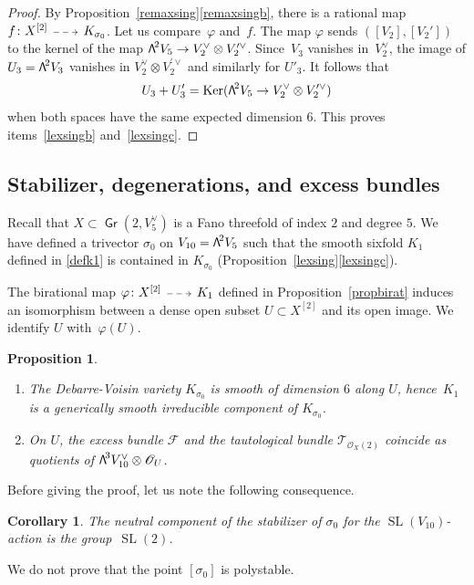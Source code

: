 \documentclass[11pt]{article}
\makeatletter
\newcommand{\skpt}{\smallskip}
\let\mathcal\mathscr
\newenvironment{enumeratea}
{\bgroup\def\theenumi{\alph{enumi}}\def\theenumii{\arabic{enumii}}\begin{enumerate}}
{\end{enumerate}\egroup}
\newcommand{\dradpl}{{\!\!\xymatrix@C=8mm{\ar@{-->}[r]&}\!\!}}
\newcommand{\dratst}{{\,\mathrel{\scalebox{.8}{$\dradpl$}}\,}}
\newcommand{\drascst}{{\,\mathrel{\scalebox{.6}{$\dradpl$}}\,}}
\newcommand{\dra}{\mathchoice{\dradpl}{\dratst}{\drascst}{\drascst}}
\newtheorem{coro}[lemm]{Corollary}
\newtheorem{prop}[lemm]{Proposition}
\theoremstyle{definition}
\newcommand\cF{\mathcal{F}}
\newcommand\cO{\mathcal{O}}\let\OO\cO
\newcommand\cT{\mathcal{T}}
\DeclareMathOperator{\Gr}{\mathsf{Gr}}
\let\phi\varphi
\let\dual\vee
\DeclareMathOperator{\Ker}{Ker}
\DeclareMathOperator{\SL}{SL}
\newcommand\bw[1]{{\hbox{\large$\mathsf{\Lambda}$}^{\!#1}}}
\renewcommand{\dratst}{\mathrel{\scalebox{.8}{$\dradpl$}}}
\renewcommand{\drascst}{\mathrel{\scalebox{.6}{$\dradpl$}}}
\makeatother
\begin{document}
\begin{proof}
By Proposition~\ref{remaxsing}\eqref{remaxsingb}, there is a rational map
$f\colon X^{[2]}\dra K_{\sigma_0}$. Let us compare~$\phi$ and~$f$. The map
$\phi$ sends $([V_2],[V_2'])$ to the kernel of the
map $\bw2V_5\to V_2^\dual\otimes V_2^{\prime\dual}$. Since~$V_3$ vanishes in~$V_2^\dual$,
the image of $U_3=\bw2V_3$ vanishes in $V_2^\dual\otimes V_2^{\prime\dual}$ and similarly for
$U'_3$. It follows that
\[
U_3+U'_3=\Ker (\bw2V_5\to V_2^\dual\otimes V_2^{\prime\dual})
\]
when both spaces have the same expected dimension $6$. This proves items~\eqref{lexsingb} and~\eqref{lexsingc}.
\end{proof}

\subsection{Stabilizer, degenerations, and excess bundles}
Recall that $X\subset \Gr(2,V_5^\dual)$ is a Fano threefold of index $2$ and degree $5$. We have defined a trivector $\sigma_0$ on $V_{10}=\bw2V_5$ such that the smooth sixfold $K_1$ defined in \eqref{defk1} is contained in $K_{\sigma_0}$ (Proposition~\ref{lexsing}\eqref{lexsingc}).

The birational map
$\phi\colon X^{[2]}\dra K_1$ defined in Proposition~\ref{propbirat}
induces an isomorphism between
a dense open subset $U\subset X^{[2]}$ and its open image. We identify $U$ with~$\phi(U)$.

\skpt
\begin{prop}\label{prop69}
\begin{enumeratea}
\item\label{prop69a}
The Debarre-Voisin variety $K_{\sigma_0}$ is smooth of dimension $6$ along
$U$, hence~$K_1$ is a generically smooth irreducible component of $K_{\sigma_0}$.

\item\label{prop69b}
On $U$, the excess bundle $\cF$ and the tautological bundle
$\cT_{\cO_X(2)}$ coincide as quotients of $\bw3V_{10}^\vee\otimes \cO_U$.
\end{enumeratea}
\end{prop}

Before giving the proof, let us note the following consequence.

\begin{coro} \label{corstabgenus6}
The neutral component of the stabilizer of $\sigma_0$ for the $\SL(V_{10})$-action is the group~$\SL( 2)$.
\end{coro}

{We do not prove that the point $[\sigma_0]$ is polystable.}
\end{document}
